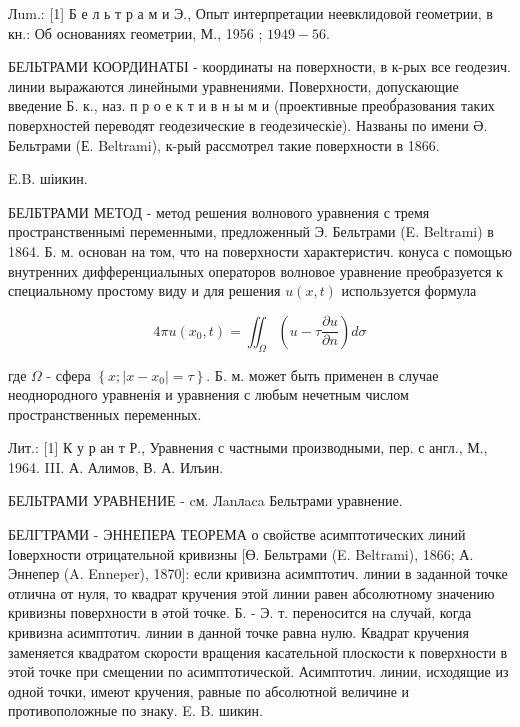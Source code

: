 \documentclass[10pt]{article}
\begin{document}
Лum.: [1] Б е л ь т р а м и Э., Опыт интерпретации неевклидовой геометрии, в кн.: Об основаниях геометрии, М., 1956 ; $1949-56$.



БЕЛЬТРАМИ КООРДИНАТБІ - координаты на поверхности, в к-рых все геодезич. линии выражаются линейными уравнениями. Поверхности, допускающие введение Б. к., наз. п р о е к т и в н ы м и (проективные преоб́разования таких поверхностей переводят геодезические в геодезическіе). Названы по имени Ә. Бельтрами (Е. Beltrami), к-рый рассмотрел такие поверхности в 1866.



E.B. шіикин.



БЕЛБТРАМИ МЕТОД - метод решения волнового уравнения с тремя пространственнымі переменными, предложенный Э. Бельтрами (E. Beltrami) в 1864. Б. м. основан на том, что на поверхности характеристич. конуса с помощью внутренних дифференциалыных операторов волновое уравнение преобразуется к специальному простому виду и для решения $u(x, t)$ используется формула



\[

4 \pi u\left(x_{0}, t\right)=\iint_{\Omega}\left(u-\tau \frac{\partial u}{\partial n}\right) d \sigma

\]



где $\Omega$ - сфера $\left\{x ;\left|x-x_{0}\right|=\tau\right\}$. Б. м. может быть применен в случае неоднородного уравненія и уравнения с любым нечетным числом пространственных переменных.



Лит.: [1] К у р ан т Р., Уравнения с частными производными, пер. с англ., М., 1964. III. А. Алимов, В. А. Илъин.



БЕЛЬТРАМИ УРАВНЕНИЕ - cм. Лanлaca Бельтрами уравнение.



БЕЛГТРАМИ - ЭННЕПЕРА ТЕОРЕМА о свойстве асимптотических линий Іоверхности отрицательной кривизны [Ө. Бельтрами (E. Beltrami), 1866; А. Эннепер (A. Enneper), 1870]: если кривизна асимптотич. линии в заданной точке отлична от нуля, то квадрат кручения этой линии равен абсолютному значению кривизны поверхности в әтой точке. Б. - Э. т. переносится на случай, когда кривизна асимптотич. линии в данной точке равна нулю. Квадрат кручения заменяется квадратом скорости вращения касательной плоскости к поверхности в этой точке при смещении по асимптотической. Асимптотич. линии, исходящие из одной точки, имеют кручения, равные по абсолютной величине и противоположные по знаку. E. B. шикин.
\end{document}
